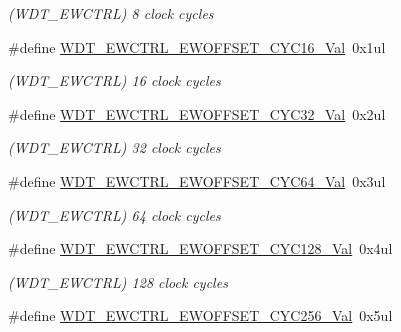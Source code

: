 \begin{DoxyCompactItemize}
\begin{DoxyCompactList}\small\item\em (W\+D\+T\+\_\+\+E\+W\+C\+T\+R\+L) 8 clock cycles \end{DoxyCompactList}\item 
\hypertarget{group___s_a_m_l21___w_d_t_gab5ebce145846cd1b4d580d1b0ab55ffa}{}\#define \hyperlink{group___s_a_m_l21___w_d_t_gab5ebce145846cd1b4d580d1b0ab55ffa}{W\+D\+T\+\_\+\+E\+W\+C\+T\+R\+L\+\_\+\+E\+W\+O\+F\+F\+S\+E\+T\+\_\+\+C\+Y\+C16\+\_\+\+Val}~0x1ul\label{group___s_a_m_l21___w_d_t_gab5ebce145846cd1b4d580d1b0ab55ffa}

\begin{DoxyCompactList}\small\item\em (W\+D\+T\+\_\+\+E\+W\+C\+T\+R\+L) 16 clock cycles \end{DoxyCompactList}\item 
\hypertarget{group___s_a_m_l21___w_d_t_ga30885a7b4794755b0b5b827d24d84a95}{}\#define \hyperlink{group___s_a_m_l21___w_d_t_ga30885a7b4794755b0b5b827d24d84a95}{W\+D\+T\+\_\+\+E\+W\+C\+T\+R\+L\+\_\+\+E\+W\+O\+F\+F\+S\+E\+T\+\_\+\+C\+Y\+C32\+\_\+\+Val}~0x2ul\label{group___s_a_m_l21___w_d_t_ga30885a7b4794755b0b5b827d24d84a95}

\begin{DoxyCompactList}\small\item\em (W\+D\+T\+\_\+\+E\+W\+C\+T\+R\+L) 32 clock cycles \end{DoxyCompactList}\item 
\hypertarget{group___s_a_m_l21___w_d_t_gaac5bdb4b6c7616f440514dbd3dd59046}{}\#define \hyperlink{group___s_a_m_l21___w_d_t_gaac5bdb4b6c7616f440514dbd3dd59046}{W\+D\+T\+\_\+\+E\+W\+C\+T\+R\+L\+\_\+\+E\+W\+O\+F\+F\+S\+E\+T\+\_\+\+C\+Y\+C64\+\_\+\+Val}~0x3ul\label{group___s_a_m_l21___w_d_t_gaac5bdb4b6c7616f440514dbd3dd59046}

\begin{DoxyCompactList}\small\item\em (W\+D\+T\+\_\+\+E\+W\+C\+T\+R\+L) 64 clock cycles \end{DoxyCompactList}\item 
\hypertarget{group___s_a_m_l21___w_d_t_ga24a8548c24ad2cdf41ad77b241ec63dd}{}\#define \hyperlink{group___s_a_m_l21___w_d_t_ga24a8548c24ad2cdf41ad77b241ec63dd}{W\+D\+T\+\_\+\+E\+W\+C\+T\+R\+L\+\_\+\+E\+W\+O\+F\+F\+S\+E\+T\+\_\+\+C\+Y\+C128\+\_\+\+Val}~0x4ul\label{group___s_a_m_l21___w_d_t_ga24a8548c24ad2cdf41ad77b241ec63dd}

\begin{DoxyCompactList}\small\item\em (W\+D\+T\+\_\+\+E\+W\+C\+T\+R\+L) 128 clock cycles \end{DoxyCompactList}\item 
\hypertarget{group___s_a_m_l21___w_d_t_gacc1a3dfab64345f1b995361254cd610d}{}\#define \hyperlink{group___s_a_m_l21___w_d_t_gacc1a3dfab64345f1b995361254cd610d}{W\+D\+T\+\_\+\+E\+W\+C\+T\+R\+L\+\_\+\+E\+W\+O\+F\+F\+S\+E\+T\+\_\+\+C\+Y\+C256\+\_\+\+Val}~0x5ul\label{group___s_a_m_l21___w_d_t_gacc1a3dfab64345f1b995361254cd610d}


\end{DoxyCompactItemize}
